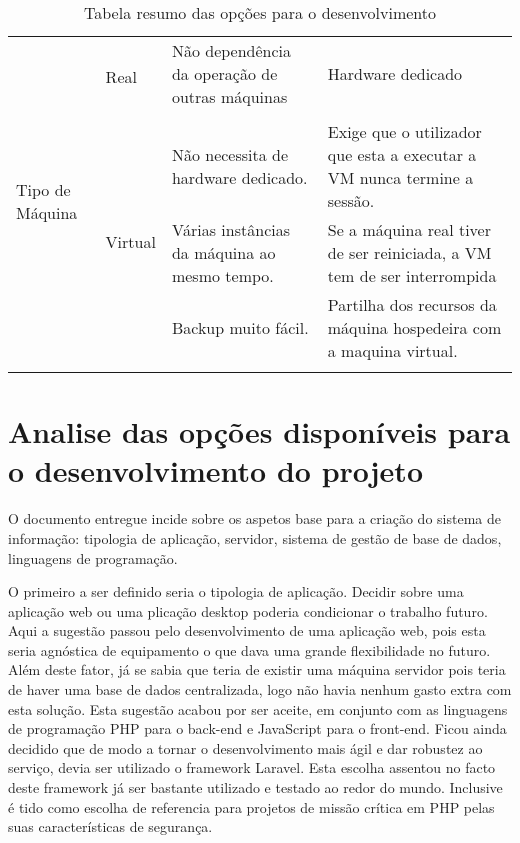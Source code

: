 \begin{longtable}{|p{}|p{}|p{}|p{}|}
	\multirow{5}{*}{Tipo de Máquina}                                        & \multirow{2}{*}{Real}                                 & Não dependência da operação de outras máquinas                      & Hardware dedicado                                                                                   \\
	&                                                       &                                                                     &                                                                                                     \\ \cline{2-4}
	& \multirow{3}{*}{Virtual}                              & Não necessita de hardware dedicado.                                 & Exige que o utilizador que esta a executar a VM nunca termine a sessão.                             \\
	&                                                       & Várias instâncias da máquina ao mesmo tempo.                        & Se a máquina real tiver de ser reiniciada, a VM tem de ser interrompida                             \\
	&                                                       & Backup muito fácil.                                                 & Partilha dos recursos da máquina hospedeira com a maquina virtual.                                  \\
	\hline
	\caption{Tabela resumo das opções para o desenvolvimento}
	\label{tab:opcoes_dev}
\end{longtable}



\section{Analise das opções disponíveis para o desenvolvimento do projeto}
O documento entregue incide sobre os aspetos base para a criação do sistema de informação: tipologia de aplicação, servidor, sistema de gestão de base de dados, linguagens de programação.

O primeiro a ser definido seria o tipologia de aplicação. Decidir sobre uma aplicação web ou uma plicação desktop poderia condicionar o trabalho futuro. Aqui a sugestão passou pelo desenvolvimento de uma aplicação web, pois esta seria agnóstica de equipamento o que dava uma grande flexibilidade no futuro. Além deste fator, já se sabia que teria de existir uma máquina servidor pois teria de haver uma base de dados centralizada, logo não havia nenhum gasto extra com esta solução. Esta sugestão acabou por ser aceite, em conjunto com as linguagens de programação PHP para o back-end e JavaScript para o front-end. Ficou ainda decidido que de modo a tornar o desenvolvimento mais ágil e dar robustez ao serviço, devia ser utilizado o framework Laravel. Esta escolha assentou no facto deste framework já ser bastante utilizado e testado ao redor do mundo. Inclusive é tido como escolha de referencia para projetos de missão crítica em PHP pelas suas características de segurança\cite{Mansuri2018}.

